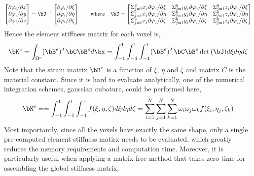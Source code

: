 \[
    \begin{bmatrix}
    \partial \varphi_i / \partial x \\
    \partial \varphi_i / \partial y \\
    \partial \varphi_i / \partial z \\
    \end{bmatrix}
    =
    \bJ^{-1}
    \begin{bmatrix}
        \partial \varphi_i / \partial \xi \\
        \partial \varphi_i / \partial \eta \\
        \partial \varphi_i / \partial \zeta \\
    \end{bmatrix}
    \quad\quad
    \text{where}\quad
    \bJ = 
    \begin{bmatrix}
        \Sigma_{j=1}^{8} x_{j} \partial \varphi_j / \partial \xi & \Sigma_{j=1}^{8} y_{j} \partial \varphi_j / \partial \xi & \Sigma_{j=1}^{8} z_{j} \partial \varphi_j / \partial \xi \\
        \Sigma_{j=1}^{8} x_{j} \partial \varphi_j / \partial \eta & \Sigma_{j=1}^{8} y_{j} \partial \varphi_j / \partial \eta & \Sigma_{j=1}^{8} z_{j} \partial \varphi_j / \partial \eta \\
        \Sigma_{j=1}^{8} x_{j} \partial \varphi_j / \partial \zeta & \Sigma_{j=1}^{8} y_{j} \partial \varphi_j / \partial \zeta & \Sigma_{j=1}^{8} z_{j} \partial \varphi_j / \partial \zeta \\
    \end{bmatrix}
\]
Hence the element stiffness matrix for each voxel is,\\
\[
    \bK^e = \int_{\Omega^e} (\bB^e)^T \bC \bB^e d\bx
    =
    \int_{-1}^{1}\int_{-1}^{1}\int_{-1}^{1} (\bB^e)^T \bC \bB^e \det{(\bJ)} d\xi d\eta d\zeta
\]
Note that the strain matrix $\bB^{e}$ is a function of $\xi$, $\eta$ and $\zeta$ and matrix $C$ is the material constant. Since it is hard to evaluate analytically, one of the numerical integration schemes, gaussian cubature, could be performed here,
\[
    \bK^e =
    = \int_{-1}^{1}\int_{-1}^{1}\int_{-1}^{1} f(\xi,\eta,\zeta) d\xi d\eta d\zeta
    = \sum_{i=1}^{N}\sum_{j=1}^{N}\sum_{k=1}^{N}\omega_{i}\omega_{j}\omega_{k}f(\xi_i,\eta_j,\zeta_k)
\]
Most importantly, since all the voxels have exactly the same shape, only a single pre-computed element stiffness matirx needs to be evaluated,
which greatly reduces the memory requirements and computation time. Moreover, it is particularly useful when applying a matrix-free method that takes zero time for assembling the global stiffness matrix.